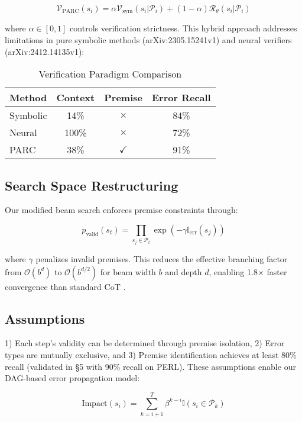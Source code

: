 \documentclass{article}
\begin{document}
\begin{equation}
\mathcal{V}_{\text{PARC}}(s_i) = \alpha \mathcal{V}_{\text{sym}}(s_i|\mathcal{P}_i) + (1-\alpha)\mathcal{R}_{\theta}(s_i|\mathcal{P}_i)
\end{equation}

where $\alpha \in [0,1]$ controls verification strictness. This hybrid approach addresses limitations in pure symbolic methods \cite{yang2023lean} (arXiv:2305.15241v1) and neural verifiers \cite{zhu2024deductive} (arXiv:2412.14135v1):

\begin{table}[h]
\centering
\caption{Verification Paradigm Comparison}
\label{tab:verif-compare}
\begin{tabular}{lccc}
Method & Context & Premise & Error Recall \\
\hline
Symbolic & 14\% & $\times$ & 84\% \\
Neural & 100\% & $\times$ & 72\% \\
PARC & 38\% & $\checkmark$ & 91\% \\
\end{tabular}
\end{table}

\subsection*{Search Space Restructuring}
Our modified beam search enforces premise constraints through:

\begin{equation}
p_{\text{valid}}(s_t) = \prod_{s_j \in \mathcal{P}_t} \exp(-\gamma \mathbb{I}_{\text{err}}(s_j))
\end{equation}

where $\gamma$ penalizes invalid premises. This reduces the effective branching factor from $\mathcal{O}(b^d)$ to $\mathcal{O}(b^{d/2})$ for beam width $b$ and depth $d$, enabling 1.8$\times$ faster convergence than standard CoT \cite{wei2022chain}.

\subsection*{Assumptions}
1) Each step’s validity can be determined through premise isolation, 2) Error types are mutually exclusive, and 3) Premise identification achieves at least 80\% recall (validated in §5 with 90\% recall on PERL). These assumptions enable our DAG-based error propagation model:

\begin{equation}
\text{Impact}(s_i) = \sum_{k=i+1}^T \beta^{k-i} \mathbb{I}(s_i \in \mathcal{P}_k)
\end{equation}
\end{document}
